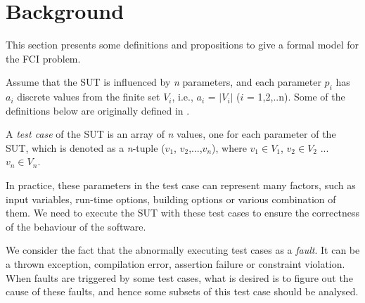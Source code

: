 \documentclass{sig-alternate}
\begin{document}
\section{Background}
This section presents some definitions and propositions to give a formal model for the FCI problem.


Assume that the SUT is influenced by \emph{n} parameters, and each parameter $p_{i}$ has $a_{i}$ discrete values from the finite set $V_{i}$, i.e., $a_{i}$ = $|V_{i}|$ ($i$ = 1,2,..n). Some of the definitions below are originally defined in .

\begin{definition}
A \emph{test case} of the SUT is an array of \emph{n} values, one for each parameter of the SUT, which is denoted as a \emph{n}-tuple ($v_{1}$, $v_{2}$,...,$v_{n}$), where $v_{1}\in V_{1}$, $v_{2} \in V_{2}$ ... $v_{n} \in V_{n}$.
\end{definition}

In practice, these parameters in the test case can represent many factors, such as input variables, run-time options, building options or various combination of them. We need to execute the SUT with these test cases to ensure the correctness of the behaviour of the software.

We consider the fact that the abnormally executing test cases as a \emph{fault}. It can be a thrown exception, compilation error, assertion failure or constraint violation. When faults are triggered by some test cases, what is desired is to figure out the cause of these faults, and hence some subsets of this test case should be analysed.


\end{document}
